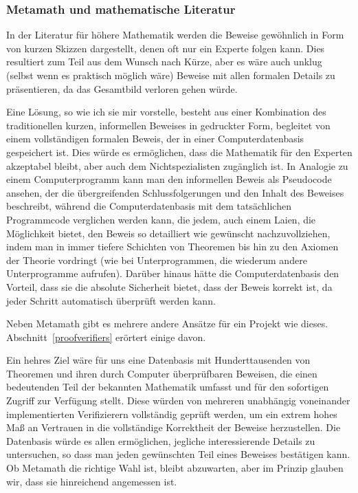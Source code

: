 \subsubsection{Metamath und mathematische Literatur}

In der Literatur für höhere Mathematik werden die Beweise gewöhnlich in Form von kurzen Skizzen dargestellt, denen oft nur ein Experte folgen kann.  Dies resultiert zum Teil aus dem Wunsch nach Kürze, aber es wäre auch unklug (selbst wenn es praktisch möglich wäre) Beweise mit allen formalen Details zu präsentieren, da das Gesamtbild verloren gehen würde.

Eine Lösung\label{envision}, so wie ich sie mir vorstelle, besteht aus einer Kombination des traditionellen kurzen, informellen Beweises in gedruckter Form, begleitet von einem vollständigen formalen Beweis, der in einer Computerdatenbasis gespeichert ist. Dies würde es ermöglichen, dass die Mathematik für den Experten akzeptabel bleibt, aber auch dem Nichtspezialisten zugänglich ist.
In Analogie zu einem Computerprogramm kann man den informellen Beweis als Pseudocode ansehen, der die übergreifenden Schlussfolgerungen und den Inhalt des Beweises beschreibt, während die Computerdatenbasis mit dem tatsächlichen Programmcode verglichen werden kann, die jedem, auch einem Laien, die Möglichkeit bietet, den Beweis so detailliert wie gewünscht nachzuvollziehen, indem man in immer tiefere Schichten von Theoremen bis hin zu den Axiomen der Theorie vordringt (wie bei Unterprogrammen, die wiederum andere Unterprogramme aufrufen).  Darüber hinaus hätte die Computerdatenbasis den Vorteil, dass sie die absolute Sicherheit bietet, dass der Beweis korrekt ist, da jeder Schritt automatisch überprüft werden kann.

Neben Metamath gibt es mehrere andere Ansätze für ein Projekt wie dieses.  Abschnitt~\ref{proofverifiers} erörtert einige davon.

Ein hehres Ziel wäre für uns eine Datenbasis mit Hunderttausenden von Theoremen und ihren durch Computer überprüfbaren Beweisen, die einen bedeutenden Teil der bekannten Mathematik umfasst und für den sofortigen Zugriff zur Verfügung stellt.
Diese würden von mehreren unabhängig voneinander implementierten Verifizierern vollständig geprüft werden, um ein extrem hohes Maß an Vertrauen in die vollständige Korrektheit der Beweise herzustellen.
Die Datenbasis würde es allen ermöglichen, jegliche interessierende Details zu untersuchen, so dass man jeden gewünschten Teil eines Beweises bestätigen kann.
Ob Metamath die richtige Wahl ist, bleibt abzuwarten, aber im Prinzip glauben wir, dass sie hinreichend angemessen ist.


